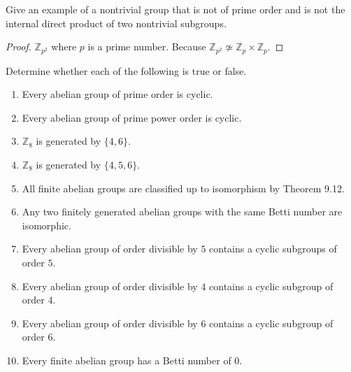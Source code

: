 \begin{exercise}
    Give an example of a nontrivial group that is not of prime order and is not the internal direct product of two nontrivial subgroups.
\end{exercise}

\begin{proof}
    $\mathbb{Z}_{p^{2}}$ where $p$ is a prime number. Because $\mathbb{Z}_{p^{2}} \not\simeq \mathbb{Z}_{p} \times \mathbb{Z}_{p}$.
\end{proof}

\begin{exercise}
    Determine whether each of the following is true or false.
    \begin{enumerate}[label={\textbf{\arabic*.}}]
        \item Every abelian group of prime order is cyclic.
        \item Every abelian group of prime power order is cyclic.
        \item $\mathbb{Z}_{8}$ is generated by $\{ 4, 6 \}$.
        \item $\mathbb{Z}_{8}$ is generated by $\{ 4, 5, 6 \}$.
        \item All finite abelian groups are classified up to isomorphism by Theorem 9.12.
        \item Any two finitely generated abelian groups with the same Betti number are isomorphic.
        \item Every abelian group of order divisible by $5$ contains a cyclic subgroups of order $5$.
        \item Every abelian group of order divisible by $4$ contains a cyclic subgroup of order $4$.
        \item Every abelian group of order divisible by $6$ contains a cyclic subgroup of order $6$.
        \item Every finite abelian group has a Betti number of $0$.
    \end{enumerate}
\end{exercise}

